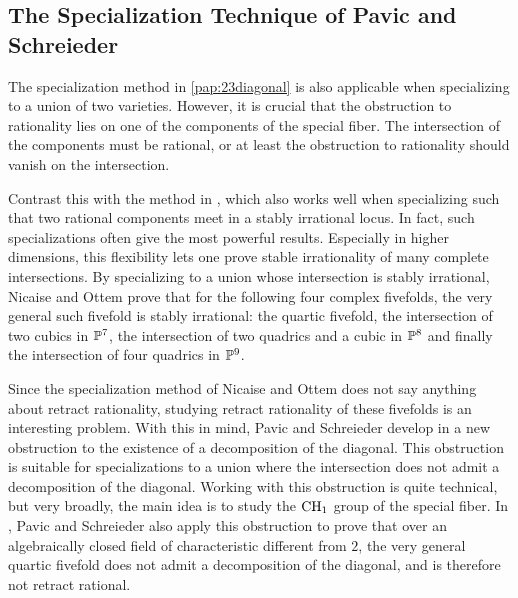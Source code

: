 \subsection{The Specialization Technique of Pavic and Schreieder}
The specialization method in \cref{pap:23diagonal} is also applicable when specializing to a union of two varieties. However, it is crucial that the obstruction to rationality lies on one of the components of the special fiber. The intersection of the components must be rational, or at least the obstruction to rationality should vanish on the intersection.

Contrast this with the method in \cite{NicaiseOttem}, which also works well when specializing such that two rational components meet in a stably irrational locus. In fact, such specializations often give the most powerful results. Especially in higher dimensions, this flexibility lets one prove stable irrationality of many complete intersections. By specializing to a union whose intersection is stably irrational, Nicaise and Ottem prove that for the following four complex fivefolds, the very general such fivefold is stably irrational: the quartic fivefold, the intersection of two cubics in $\P^7$, the intersection of two quadrics and a cubic in $\P^8$ and finally the intersection of four quadrics in $\P^9$.

Since the specialization method of Nicaise and Ottem does not say anything about retract rationality, studying retract rationality of these fivefolds is an interesting problem. With this in mind, Pavic and Schreieder develop in \cite{PavicSchreieder} a new obstruction to the existence of a decomposition of the diagonal. This obstruction is suitable for specializations to a union where the intersection does not admit a decomposition of the diagonal. Working with this obstruction is quite technical, but very broadly, the main idea is to study the $\CH_1$ group of the special fiber.
In \cite{PavicSchreieder}, Pavic and Schreieder also apply this obstruction to prove that over an algebraically closed field of characteristic different from $2$, the very general quartic fivefold does not admit a decomposition of the diagonal, and is therefore not retract rational.

